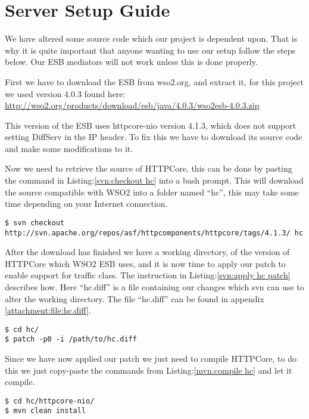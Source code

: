 \section{Server Setup Guide}\label{Server Setup Guide}
	\begin{shaded}
	We have altered some source code which our project is dependent upon. That is why it is quite important that anyone wanting to use our setup follow the steps below. Our ESB mediators will not work unless this is done properly.
	\end{shaded}

	First we have to download the ESB from wso2.org, and extract it, for this project we used version 4.0.3 found here:
\url{http://wso2.org/products/download/esb/java/4.0.3/wso2esb-4.0.3.zip}

	This version of the ESB uses httpcore-nio version 4.1.3, which does not support setting DiffServ in the IP header. To fix this we have to download its source code and make some modifications to it.

	Now we need to retrieve the source of HTTPCore, this can be done by pasting the command in Listing:\ref{svn:checkout hc} into a bash prompt. This will download the source compatible with WSO2 into a folder named “hc”, this may take some time depending on your Internet connection.
\lstset{language=bash, style=shell}
\begin{lstlisting}[frame=single, caption={Checkout HttpCore source}, label=svn:checkout hc, breaklines=true]
$ svn checkout http://svn.apache.org/repos/asf/httpcomponents/httpcore/tags/4.1.3/ hc
\end{lstlisting}

	After the download has finished we have a working directory, of the version of HTTPCore which WSO2 ESB uses, and it is now time to apply our patch to enable support for traffic class. The instruction in Listing:\ref{svn:apply hc patch} describes how. Here “hc.diff” is a file containing our changes which svn can use to alter the working directory. The file “hc.diff” can be found in appendix \ref{attachment:file:hc.diff}.
\begin{lstlisting}[frame=single, caption={Apply HC patch}, label=svn:apply hc patch]
$ cd hc/
$ patch -p0 -i /path/to/hc.diff
\end{lstlisting}

	Since we have now applied our patch we just need to compile HTTPCore, to do this we just copy-paste the commands from Listing:\ref{mvn:compile hc} and let it compile.
\begin{lstlisting}[frame=single, caption={Build HttpCore-NIO}, label=mvn:compile hc, breaklines=true]
$ cd hc/httpcore-nio/
$ mvn clean install
\end{lstlisting}

